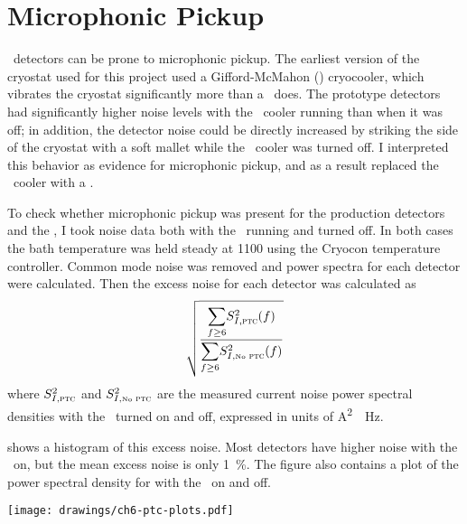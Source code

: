 \section{Microphonic Pickup} \label{sec:ch6-microphonic-pickup}


\TES\ detectors can be prone to microphonic pickup.
The earliest version of the cryostat used for this project used a Gifford-McMahon (\GM) cryocooler, which vibrates the cryostat significantly more than a \PTC\ does.
The prototype detectors had significantly higher noise levels with the \GM\ cooler running than when it was off; in addition, the detector noise could be directly increased by striking the side of the cryostat with a soft mallet while the \GM\ cooler was turned off.
I interpreted this behavior as evidence for microphonic pickup, and as a result replaced the \GM\ cooler with a \PTC.

To check whether microphonic pickup was present for the production detectors and the \PTC, I took noise data both with the \PTC\ running and turned off.
In both cases the bath temperature was held steady at \SI{1100}{\mK} using the Cryocon temperature controller.
Common mode noise was removed and power spectra for each detector were calculated.
Then the excess noise for each detector was calculated as
\begin{equation}
  \sqrt{  \frac{ {\displaystyle \sum_{f \ge 6}} S^2_{I,\textsc{ptc}}(f) }
               { {\displaystyle \sum_{f \ge 6}} S^2_{I,\mbox{\tiny{No}}\textsc{ ptc}}(f) }}
\end{equation}
where $S^2_{I,\textsc{ptc}}$ and $S^2_{I,\mbox{\tiny{No}}\textsc{ ptc}}$ are the measured current noise power spectral densities with the \PTC\ turned on and off, expressed in units of \si{\A^2 \per \Hz}.

 shows a histogram of this excess noise.
Most detectors have higher noise with the \PTC\ on, but the mean excess noise is only \SI{1}{\percent}.
The figure also contains a plot of the power spectral density for  with the \PTC\ on and off.

\begin{figure*}
  \centering
\texttt{[image: drawings/ch6-ptc-plots.pdf]}
\caption[Plots showing impact of \PTC\ on noise]{
Plots showing impact of \PTC\ on noise.
\textbf{Left}
Histogram showing excess noise due to the \PTC, defined as ratio of total noise above \SI{6}{\Hz} (see text for precise definition).
More detectors have higher noise with the \PTC\ on than off, but the mean excess noise is only \SI{1}{\percent}.
\textbf{Right}
Current noise for  with \PTC\ on and off, after subtracting common mode noise.
The noise below \SI{30}{\Hz} is 1.5--2.5 times higher with the \PTC\ on, but the total noise at the relevant frequencies of $f >= \SI{6}{\Hz}$ is only \SI{2.9}{\percent}.
}
\label{fig:ch6-ptc-plots}
\end{figure*}

